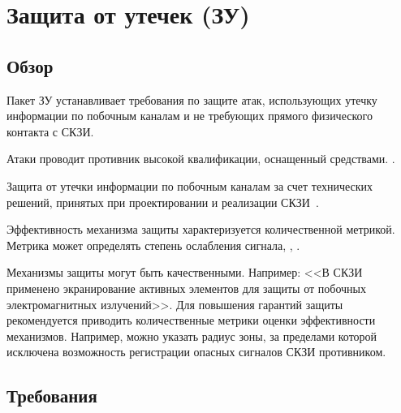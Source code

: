 \section{Защита от утечек (ЗУ)}\label{NI}

\subsection{Обзор}\label{NI.Intro}

Пакет ЗУ устанавливает требования по защите  атак, 
использующих утечку информации по побочным каналам и не требующих прямого 
физического контакта с СКЗИ.

Атаки проводит противник высокой квалификации, оснащенный 
 средствами. 
.

Защита от утечки информации по побочным каналам  
за счет технических решений, принятых при проектировании и реализации 
СКЗИ~. 
%

Эффективность механизма защиты характеризуется количественной метрикой.
Метрика может определять степень ослабления сигнала, , 
.
%

Механизмы защиты могут быть качественными. Например: 
<<В СКЗИ применено экранирование активных элементов для защиты от побочных 
электромагнитных излучений>>. 
%
Для повышения гарантий защиты рекомендуется приводить количественные метрики 
оценки эффективности механизмов. Например, можно указать радиус зоны, 
за пределами которой исключена возможность регистрации опасных сигналов 
СКЗИ противником.
\fi

\subsection{Требования}\label{NI.Reqs}


